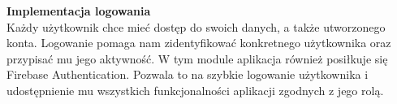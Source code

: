 \noindent
\textbf{Implementacja logowania}\\
\indent Każdy użytkownik chce mieć dostęp do swoich danych, a także utworzonego konta. Logowanie pomaga nam zidentyfikować konkretnego użytkownika oraz przypisać mu jego aktywność. W tym module aplikacja również posiłkuje się Firebase Authentication. Pozwala to na szybkie logowanie użytkownika i udostępnienie mu wszystkich funkcjonalności aplikacji zgodnych z jego rolą.\\
\noindent
\setlength{\fboxrule}{0.5pt}
\begin{minipage}{\linewidth}
    \label{lst:login}
    \centering
\end{minipage}


